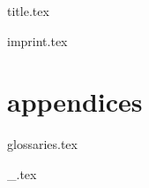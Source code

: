 \documentclass[a4paper,10pt,twocolumn,openany]{book}
\begin{document}
  \frontmatter
  {title.tex}

  \ifauthornotes
    {imprint.tex}
  \fi

  
  \twocolumn
  \mainmatter


  \setcounter{chapter}{0}


  \part{appendices}
  \appendix
    {glossaries.tex}

  \ifauthornotes
    {_.tex}
  \fi
\end{document}
